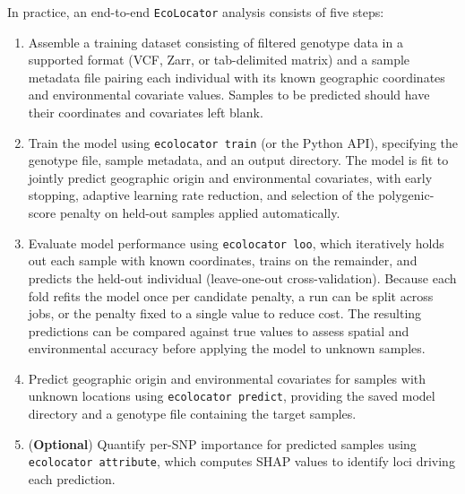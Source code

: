 \documentclass[]{article}
\newcommand{\ecolocator}{\texttt{EcoLocator}\xspace}
\begin{document}
In practice, an end-to-end \ecolocator analysis consists of five steps:
\begin{enumerate}
\item Assemble a training dataset consisting of filtered genotype data 
in a supported format (VCF, Zarr, or tab-delimited matrix) 
and a sample metadata file pairing each individual with its 
known geographic coordinates and environmental covariate values. 
Samples to be predicted should have their coordinates and covariates 
left blank.

\item Train the model using \texttt{ecolocator train} (or the Python API), 
specifying the genotype file, sample metadata, and an output directory. 
The model is fit to jointly predict geographic origin and environmental 
covariates, with early stopping, adaptive learning rate reduction, and
selection of the polygenic-score penalty on held-out samples applied 
automatically.

\item Evaluate model performance using \texttt{ecolocator loo}, 
which iteratively holds out each sample with known coordinates, trains 
on the remainder, and predicts the held-out individual (leave-one-out cross-validation).
Because each fold refits the model once per candidate penalty, a run can be
split across jobs, or the penalty fixed to a single value to reduce cost.
The resulting predictions can be compared against true values to assess spatial and 
environmental accuracy before applying the model to unknown samples.

\item Predict geographic origin and environmental covariates for samples 
with unknown locations using \texttt{ecolocator predict}, providing the 
saved model directory and a genotype file containing the target samples.

\item (\textbf{Optional}) Quantify per-SNP importance for predicted samples 
using \texttt{ecolocator attribute}, which computes SHAP values to 
identify loci driving each prediction.
\end{enumerate}

\end{document}
